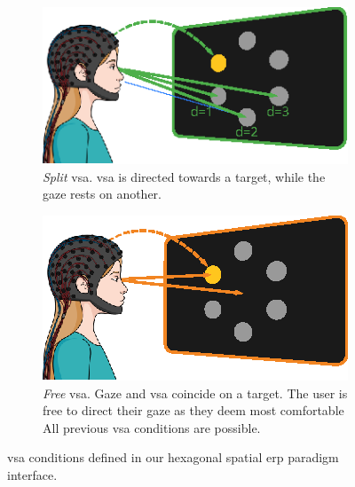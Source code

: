 \begin{figure}
  \begin{subfigure}[t]{.45\textwidth}
    \includegraphics[width=\textwidth]{figures/gaze_independence/attention_split.eps}
    \caption[Split \ac{vsa}]{%
      \emph{Split} \ac{vsa}.
      \Ac{vsa} is directed towards a target, while the gaze rests on another.
    }
    \label{fig:gaze/vsa/split}
  \end{subfigure}\hfill%
   \begin{subfigure}[t]{.45\textwidth}
    \includegraphics[width=\textwidth]{figures/gaze_independence/attention_free.eps}
    \caption[Free \ac{vsa}]{%
      \emph{Free} \ac{vsa}.
      Gaze and \ac{vsa} coincide on a target.
      The user is free to direct their gaze as they deem most comfortable
      All previous \ac{vsa} conditions are possible.
    }
    \label{fig:gaze/vsa/free}
  \end{subfigure}\hfill%
  \caption[\Ac{vsa} conditions]{%
    \Ac{vsa} conditions defined in our hexagonal spatial \ac{erp} paradigm interface.
  }
  \label{fig:gaze/vsa}
\end{figure}

